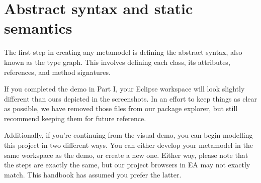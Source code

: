 \newpage
\section{Abstract syntax and static semantics}
\genHeader
\label{sec: staticSemantics}

The first step in creating any metamodel is defining the abstract syntax, also known as the type graph. This involves defining each class, its attributes,
references, and method signatures.

If you completed the demo in Part I, your Eclipse workspace will look slightly different than ours depicted in the screenshots.
In an effort to keep things as clear as possible, we have removed those files from our package explorer, but still recommend keeping them for future reference. 

Additionally, if you're continuing from the visual demo, you can begin modelling this project in two different ways. 
You can either develop your metamodel in the same workspace as the demo, or create a new one.
Either way, please note that the steps are exactly the same, but our project browsers in EA may not exactly match.
This handbook has assumed you prefer the latter.
















 
